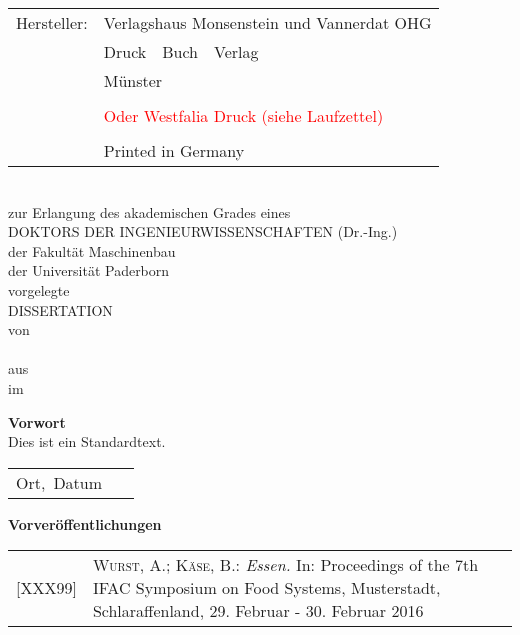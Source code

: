 \begin{titlepage}

	\noindent
	\begin{tabular}{@{}ll} %
	Hersteller:& Verlagshaus Monsenstein und Vannerdat OHG\\
						& Druck~~Buch~~Verlag\\  
						&Münster\\
						\vspace{12bp}\\
						& \textcolor{red}{Oder Westfalia Druck (siehe Laufzettel)}\\
						\vspace{12bp}\\
						& Printed in Germany
	\end{tabular}

	\newpage
	\pagestyle{empty}
	\sffamily
	\begin{center}
		\fontsize{14bp}{1.5\baselineskip}\selectfont 
		\textbf{\meinTitel}\\		
		\vspace{2cm}
		\fontsize{12bp}{5\baselineskip}\selectfont
		zur Erlangung des akademischen Grades eines \\
		DOKTORS DER INGENIEURWISSENSCHAFTEN (Dr.-Ing.)\\
		der Fakultät Maschinenbau \\
		der Universität Paderborn \\
		\vspace{6 cm}		
		vorgelegte\\ %
		DISSERTATION \\
		\vspace{3 cm}
		von \\
		\meinVorName~\meinNachName\\
		aus \meinOrt \\
		im \meinErstellungsdatum 
	\end{center}
	\cleardoublepage
	\textbf{Vorwort}\\[\baselineskip]
	\normalfont
	Dies ist ein Standardtext.
	\vfill
	
	
	\begin{tabular}{p{}p{}}
		Ort,~Datum&\meinVorName~\meinNachName
	\end{tabular}
	\cleardoublepage
	\sffamily
	\textbf{Vorveröffentlichungen}\\[1em]
	\normalfont\fontsize{10bp}{\baselineskip}\selectfont
	\begin{tabular}{@{}l p{12cm}}
		[XXX99] & \textsc{Wurst, A.; Käse, B.:} \textit{Essen.} In: Proceedings of the 7th IFAC Symposium on Food Systems, Musterstadt, Schlaraffenland, 29. Februar - 30. Februar 2016\\ [0.5em] 
	\end{tabular}
	

\end{titlepage}
